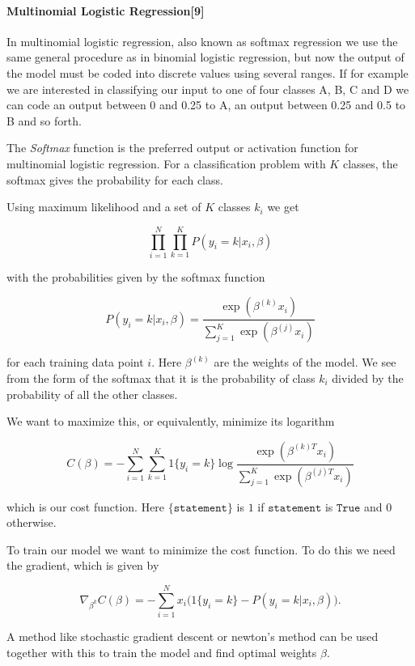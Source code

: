 \documentclass[11pt]{article}
\begin{document}
    \hypertarget{multinomial-logistic-regression9}{%
\paragraph{Multinomial Logistic
Regression{[}9{]}}\label{multinomial-logistic-regression9}}

In multinomial logistic regression, also known as softmax regression we
use the same general procedure as in binomial logistic regression, but
now the output of the model must be coded into discrete values using
several ranges. If for example we are interested in classifying our
input to one of four classes A, B, C and D we can code an output between
0 and 0.25 to A, an output between 0.25 and 0.5 to B and so forth.

The \emph{Softmax} function is the preferred output or activation
function for multinomial logistic regression. For a classification
problem with \(K\) classes, the softmax gives the probability for each
class.

Using maximum likelihood and a set of \(K\) classes \(k_i\) we get

\[
\prod_{i=1}^N\prod_{k=1}^K P(y_i=k|x_i,\beta)
\]

with the probabilities given by the softmax function

\[
P(y_i=k|x_i,\beta) = \frac{\exp(\beta^{(k)}x_i)}{\sum_{j=1}^K \exp(\beta^{(j)}x_i)}
\]

for each training data point \(i\). Here \(\beta^{(k)}\) are the weights
of the model. We see from the form of the softmax that it is the
probability of class \(k_i\) divided by the probability of all the other
classes.

We want to maximize this, or equivalently, minimize its logarithm

\[
C(\beta) = -\sum_{i=1}^N\sum_{k=1}^K 1\{y_i=k\}\log\frac{\exp(\beta^{(k)T}x_i)}{\sum_{j=1}^K \exp(\beta^{(j)T}x_i)}
\]

which is our cost function. Here \(\{\texttt{statement}\}\) is \(1\) if
\(\texttt{statement}\) is \(\texttt{True}\) and \(0\) otherwise.

To train our model we want to minimize the cost function. To do this we
need the gradient, which is given by

\[
\nabla_{\beta^k} C(\beta) = -\sum_{i=1}^Nx_i\bigg(1\{y_i=k\}-P(y_i=k|x_i,\beta)\bigg).
\]

A method like stochastic gradient descent or newton's method can be used
together with this to train the model and find optimal weights
\(\beta\).
\end{document}
